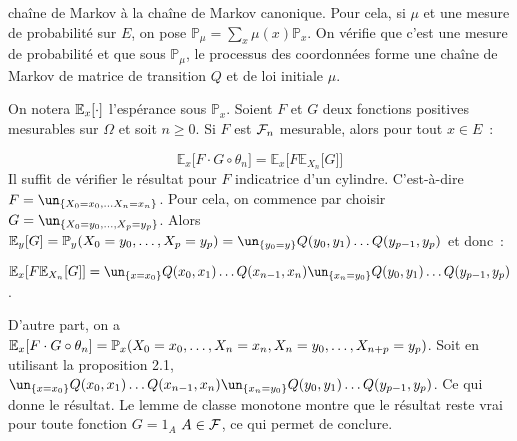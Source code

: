 chaîne de Markov à la chaîne de Markov canonique. Pour cela, si $\mu$ et une mesure de probabilité sur $E$,
on pose $\mathbb{P}_\mu = \sum_x \mu(x)\mathbb{P}_x$. On vérifie que c'est une mesure de probabilité et
que sous $\mathbb{P}_\mu$, le processus des coordonnées forme une chaîne de Markov de matrice de transition
$Q$ et de loi initiale $\mu$.\par
On notera $\mathbb{E}_{x}\lbrack \cdot\rbrack$ l'espérance sous $\mathbb{P}_x$.
Soient $F$ et $G$ deux fonctions positives mesurables sur $\Omega$ et soit $n\geq 0$.
Si $F$ est $\mathcal{F}_n$ mesurable, alors pour tout $x\in E$~:\par
$$\mathbb{E}_x\lbrack F\cdot G\circ\theta_n\rbrack=\mathbb{E}_x\lbrack F\mathbb{E}_{X_n}\lbrack 
                                                                                      G\rbrack\rbrack$$
\dem Il suffit de vérifier le résultat pour $F$ indicatrice d'un cylindre. C'est-à-dire
$F =\un_{\ens{X_0=x_0,\ldots X_n=x_n}}$. Pour cela, on commence par choisir 
$G = \un_{\ens{X_0=y_0,\ldots,X_p=y_p}}$. Alors $\eesp{y}{G} = \mathbb{P}_y(X_0=y_0,\ldots,X_p=y_p) = 
\un_{\ens{y_0=y}}Q(y_0,y_1)\ldots Q(y_{p-1},y_p)$ et donc~:\par 
$\eesp{x}{F\eesp{X_n}{G}} = \un_{\ens{x=x_0}}Q(x_0,x_1)\ldots
Q(x_{n-1},x_n)\un_{\ens{x_n=y_0}}Q(y_0,y_1)\ldots Q(y_{p-1},y_p)$.\par
D'autre part, on a $\mathbb{E}_{x}\lbrack F\cdot G\circ\theta_n\rbrack = \mathbb{P}_x(X_0=x_0,\ldots,X_n=x_n,X_n=y_0,\ldots,
X_{n+p} = y_p)$. Soit en utilisant la proposition 2.1, $\un_{\ens{x=x_0}}Q(x_0,x_1)\ldots Q(x_{n-1},x_n)
\un_{\ens{x_n=y_0}}Q(y_0,y_1)\ldots Q(y_{p-1},y_p)$. Ce qui donne le résultat. Le lemme de classe monotone
montre que le résultat reste vrai pour toute fonction $G=1_A$ $A\in\mathcal{F}$, ce qui permet de conclure.

